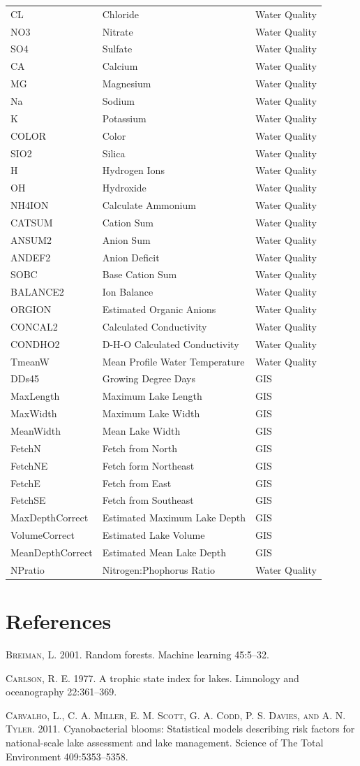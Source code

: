 \documentclass[11pt,]{article}
\begin{document}
\begin{longtable}[c]{@{}lll@{}}
CL & Chloride & Water Quality\tabularnewline
NO3 & Nitrate & Water Quality\tabularnewline
SO4 & Sulfate & Water Quality\tabularnewline
CA & Calcium & Water Quality\tabularnewline
MG & Magnesium & Water Quality\tabularnewline
Na & Sodium & Water Quality\tabularnewline
K & Potassium & Water Quality\tabularnewline
COLOR & Color & Water Quality\tabularnewline
SIO2 & Silica & Water Quality\tabularnewline
H & Hydrogen Ions & Water Quality\tabularnewline
OH & Hydroxide & Water Quality\tabularnewline
NH4ION & Calculate Ammonium & Water Quality\tabularnewline
CATSUM & Cation Sum & Water Quality\tabularnewline
ANSUM2 & Anion Sum & Water Quality\tabularnewline
ANDEF2 & Anion Deficit & Water Quality\tabularnewline
SOBC & Base Cation Sum & Water Quality\tabularnewline
BALANCE2 & Ion Balance & Water Quality\tabularnewline
ORGION & Estimated Organic Anions & Water Quality\tabularnewline
CONCAL2 & Calculated Conductivity & Water Quality\tabularnewline
CONDHO2 & D-H-O Calculated Conductivity & Water Quality\tabularnewline
TmeanW & Mean Profile Water Temperature & Water Quality\tabularnewline
DDs45 & Growing Degree Days & GIS\tabularnewline
MaxLength & Maximum Lake Length & GIS\tabularnewline
MaxWidth & Maximum Lake Width & GIS\tabularnewline
MeanWidth & Mean Lake Width & GIS\tabularnewline
FetchN & Fetch from North & GIS\tabularnewline
FetchNE & Fetch form Northeast & GIS\tabularnewline
FetchE & Fetch from East & GIS\tabularnewline
FetchSE & Fetch from Southeast & GIS\tabularnewline
MaxDepthCorrect & Estimated Maximum Lake Depth & GIS\tabularnewline
VolumeCorrect & Estimated Lake Volume & GIS\tabularnewline
MeanDepthCorrect & Estimated Mean Lake Depth & GIS\tabularnewline
NPratio & Nitrogen:Phophorus Ratio & Water Quality\tabularnewline
\bottomrule
\end{longtable}

\newpage

\section*{References}\label{references}

\textsc{Breiman, L.} 2001. Random forests. Machine learning 45:5--32.

\textsc{Carlson, R. E.} 1977. A trophic state index for lakes. Limnology
and oceanography 22:361--369.

\textsc{Carvalho, L., C. A. Miller, E. M. Scott, G. A. Codd, P. S.
Davies, and A. N. Tyler}. 2011. Cyanobacterial blooms: Statistical
models describing risk factors for national-scale lake assessment and
lake management. Science of The Total Environment 409:5353--5358.
\end{document}
